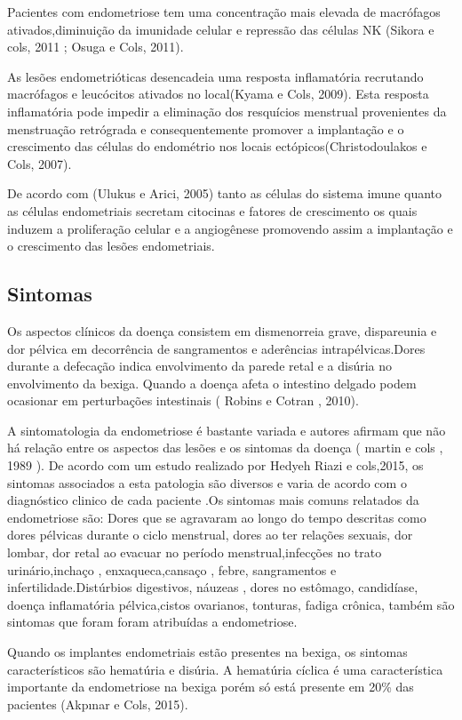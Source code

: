 \documentclass[12pt]{article} %
\begin{document}
Pacientes com endometriose tem uma concentração mais elevada de macrófagos ativados,diminuição da imunidade celular e repressão das células NK (Sikora e cols, 2011 ; Osuga e Cols, 2011).      

As lesões endometrióticas desencadeia uma resposta inflamatória recrutando macrófagos e leucócitos ativados no local(Kyama e Cols, 2009). Esta resposta inflamatória pode impedir a eliminação dos resquícios menstrual provenientes da menstruação retrógrada e consequentemente promover a implantação e o crescimento das células do endométrio nos locais ectópicos(Christodoulakos e Cols, 2007). 

De acordo com (Ulukus e Arici, 2005) tanto as células do sistema imune  quanto as células endometriais secretam citocinas e fatores de crescimento os quais induzem a proliferação celular e a angiogênese promovendo assim a implantação e o crescimento das lesões endometriais.




\subsection{Sintomas} 


Os aspectos clínicos da doença consistem em dismenorreia grave, dispareunia e dor pélvica em decorrência de sangramentos e aderências intrapélvicas.Dores durante a defecação indica envolvimento da parede retal e a disúria no envolvimento da bexiga. Quando a doença afeta o intestino delgado podem ocasionar em perturbações intestinais ( Robins e Cotran , 2010).

A sintomatologia da endometriose  é bastante variada e autores afirmam que não há relação entre os aspectos das lesões e os sintomas da doença ( martin e cols , 1989 ).
De acordo com um estudo realizado por Hedyeh Riazi e cols,2015, os sintomas associados a esta patologia são diversos e varia de acordo com o diagnóstico clinico de cada paciente .Os sintomas mais comuns relatados da endometriose são: Dores que se agravaram ao longo do tempo descritas como dores pélvicas durante o ciclo menstrual, dores ao ter relações sexuais, dor lombar, dor retal ao evacuar no período menstrual,infecções no trato urinário,inchaço , enxaqueca,cansaço , febre, sangramentos e infertilidade.Distúrbios digestivos, náuzeas , dores no estômago, candidíase, doença inflamatória pélvica,cistos ovarianos,  tonturas, fadiga crônica, também são sintomas que foram foram atribuídas a endometriose.

Quando os implantes endometriais estão presentes na bexiga, os sintomas característicos são hematúria e disúria. A hematúria cíclica é uma característica importante da endometriose na bexiga porém só está presente em 20\% das pacientes (Akpınar e Cols, 2015).
\end{document}
